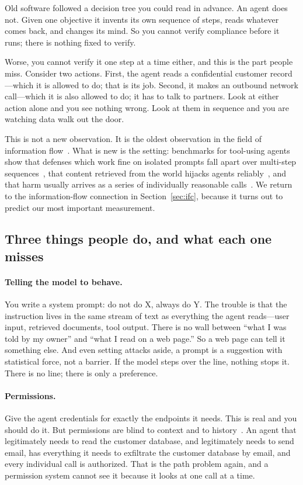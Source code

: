 \documentclass[11pt]{article}
\begin{document}
Old software followed a decision tree you could read in advance. An agent does
not. Given one objective it invents its own sequence of steps, reads whatever
comes back, and changes its mind. So you cannot verify compliance before it
runs; there is nothing fixed to verify.

Worse, you cannot verify it one step at a time either, and this is the part
people miss. Consider two actions. First, the agent reads a confidential
customer record---which it is allowed to do; that is its job. Second, it makes
an outbound network call---which it is also allowed to do; it has to talk to
partners. Look at either action alone and you see nothing wrong. Look at them
in sequence and you are watching data walk out the door.

This is not a new observation. It is the oldest observation in the field of
information flow~\cite{denning1976,goguen1982}. What is new is the setting:
benchmarks for tool-using agents show that defenses which work fine on
isolated prompts fall apart over multi-step
sequences~\cite{agentdojo,agentharm}, that content retrieved from the world
hijacks agents reliably~\cite{greshake2023,injecagent}, and that harm usually
arrives as a series of individually reasonable calls~\cite{toolemu}. We
return to the information-flow connection in Section~\ref{sec:ifc}, because it
turns out to predict our most important measurement.

\subsection{Three things people do, and what each one misses}

\paragraph{Telling the model to behave.} You write a system prompt: do not do
X, always do Y. The trouble is that the instruction lives in the same stream
of text as everything the agent reads---user input, retrieved documents, tool
output. There is no wall between ``what I was told by my owner'' and ``what I
read on a web page.'' So a web page can tell it something else. And even
setting attacks aside, a prompt is a suggestion with statistical force, not a
barrier. If the model steps over the line, nothing stops it. There is no line;
there is only a preference.

\paragraph{Permissions.} Give the agent credentials for exactly the endpoints
it needs. This is real and you should do it. But permissions are blind to
context and to history~\cite{sp800207}. An agent that legitimately needs to
read the customer database, and legitimately needs to send email, has
everything it needs to exfiltrate the customer database by email, and every
individual call is authorized. That is the path problem again, and a
permission system cannot see it because it looks at one call at a time.
\end{document}
